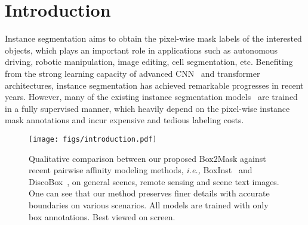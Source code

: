 \documentclass[12pt,onecolumn,letterpaper]{article}
\begin{document}
\section{Introduction}
\label{intro}
Instance segmentation aims to obtain the pixel-wise mask labels of the interested objects, which plays an important role in applications such as autonomous driving, robotic manipulation, image editing, cell segmentation, etc. Benefiting from the strong learning capacity of advanced CNN~\cite{he2016deep, densenet_cvpr2017, liu2022convnet} and transformer~\cite{vaswani2017attention, vit_iclr2020, liu2021swin} architectures, instance segmentation has achieved remarkable progresses in recent years.
However, many of the existing instance segmentation models~\cite{eccv2020boundary,cvpr2019mask,wang2020solov2,eccv2020_condinst,iccv2017maskrcnn, ICCV2021_queryinst, cvpr2022mask2former} are trained in a fully supervised manner, which heavily depend on the pixel-wise instance mask annotations and incur expensive and tedious labeling costs.


\begin{figure*}[t]
	\centering
	\texttt{[image: figs/introduction.pdf]}
	\caption{Qualitative comparison between our proposed Box2Mask against recent pairwise affinity modeling methods, \textit{i.e.,} BoxInst~\cite{cvpr2021_boxinst} and DiscoBox~\cite{iccv2021discobox}, on general scenes, remote sensing and scene text images. One can see that our method preserves finer details with accurate boundaries on various scenarios. All models are trained with only box annotations. Best viewed on screen.}
	\label{fig:introduction}
\end{figure*}
\end{document}
